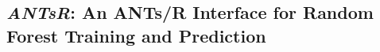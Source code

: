 \documentclass[preprint,authoryear,review,12pt]{elsarticle}
\begin{document}
%
%










\subsection{\textit{ANTsR}:  An ANTs/R Interface for Random Forest Training and Prediction}
\end{document}

